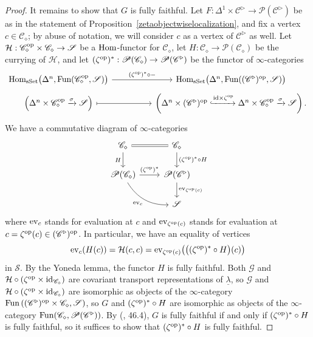 \documentclass{tac}
\newcommand{\s}[1]{\mathscr{#1}}
\renewcommand{\c}[1]{\mathcal{#1}}
\newcommand{\tx}[1]{\textnormal{#1}}
\newcommand{\ul}[1]{\underline{#1}}
\begin{document}
\begin{proof}
It remains to show that $G$ is fully faithful. Let $F : \Delta^1 \times \s{C}^\triangleright \to \s{P}(\s{C}^\triangleright )$ be as in the statement of Proposition~\ref{zetaobjectwiselocalization}, and fix a vertex $c\in \s{C}_\diamond$; by abuse of notation, we will consider $c$ as a vertex of $\s{C}^\triangleright$ as well.  Let $\c{H} : \s{C}_\diamond^\tx{op} \times \s{C}_\diamond \to \s{S}$ be a $\tx{Hom}$-functor for $\s{C}_\diamond$, let $H : \s{C}_\diamond \to \s{P} (\s{C}_\diamond )$ be the currying of $\c{H}$, and let $(\zeta^\tx{op})^* : \s{P}(\s{C}_\diamond ) \to \s{P}(\s{C}^\triangleright )$ be the functor of $\infty$-categories
\[ \begin{tikzcd}
\tx{Hom}_{\tx{sSet}} \big( \Delta^n , \tx{Fun} (\s{C}_\diamond^\tx{op} , \s{S}) \big) \arrow[]{rr}{(\zeta^\tx{op})^* \circ - } & & \tx{Hom}_{\tx{sSet}} \big( \Delta^n , \tx{Fun} ((\s{C}^\triangleright )^\tx{op} , \s{S}) \big) \\[-1.5em]
\left( \Delta^n \times \s{C}_\diamond^\tx{op} \xrightarrow{\sigma} \s{S} \right) \arrow[mapsto]{rr} & & \left( \Delta^n \times (\s{C}^\triangleright )^\tx{op} \xhookrightarrow{\tx{id} \times \zeta^\tx{op}} \Delta^n \times \s{C}_\diamond^\tx{op} \xrightarrow{\sigma} \s{S} \right) .
\end{tikzcd}\]
We have a commutative diagram of $\infty$-categories
\begin{equation}\label{diamondisfreezerocorpentagon1} \begin{tikzcd}
\s{C}_\diamond \arrow[equal]{r} \arrow[]{d}[swap]{H} & \s{C}_\diamond \arrow[]{d}{(\zeta^\tx{op})^* \circ H} \\
\s{P}(\s{C}_\diamond ) \arrow[]{r}{(\zeta^\tx{op})^* } \arrow[bend right]{dr}[swap]{\tx{ev}_c } & \s{P}(\s{C}^\triangleright ) \arrow[]{d}{\tx{ev}_{\zeta^\tx{op} (c)} } \\
& \s{S}
\end{tikzcd}\end{equation}
where $\tx{ev}_c$ stands for evaluation at $c$ and $\tx{ev}_{\zeta^\tx{op} (c)}$ stands for evaluation at $c = \zeta^\tx{op} (c) \in (\s{C}^\triangleright )^\tx{op}$.  In particular, we have an equality of vertices
\[ \tx{ev}_c (H(c)) = \c{H}(c,c) = \tx{ev}_{\zeta^\tx{op} (c)} \big( \big( (\zeta^\tx{op})^* \circ H \big) (c) \big) \]
in $\s{S}$.  By the Yoneda lemma, %
 the functor $H$ is fully faithful.  Both $\s{G}$ and $\c{H} \circ (\zeta^\tx{op} \times \tx{id}_{\s{C}_\diamond})$ are covariant transport representations of $\ul{\lambda}$, so $\s{G}$ and $\c{H} \circ (\zeta^\tx{op} \times \tx{id}_{\s{C}_\diamond})$ are isomorphic as objects of the $\infty$-category $\tx{Fun}\left( (\s{C}^\triangleright )^\tx{op} \times \s{C}_\diamond , \s{S} \right)$, so $G$ and $(\zeta^\tx{op})^* \circ H$ are isomorphic as objects of the $\infty$-category $\tx{Fun}(\s{C}_\diamond , \s{P}(\s{C}^\triangleright))$.  By (\cite{rezk}, 46.4), $G$ is fully faithful if and only if $(\zeta^\tx{op})^* \circ H$ is fully faithful, so it suffices to show that $(\zeta^\tx{op})^* \circ H$ is fully faithful.


\end{proof}
\end{document}
